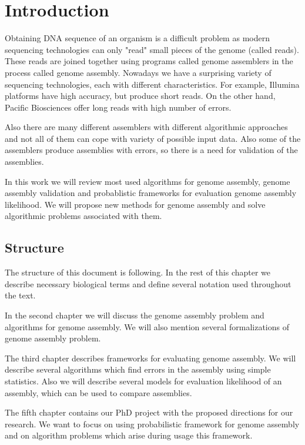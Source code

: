 \chapter{Introduction}

Obtaining DNA sequence of an organism is a difficult problem
as modern sequencing technologies can only "read" small pieces
of the genome (called reads). 
These reads are joined together using programs called genome assemblers
in the process called genome assembly.
Nowadays we have a surprising variety of sequencing technologies,
each with different characteristics. For example,
Illumina platforms have high accuracy, but produce short reads. 
On the other hand, Pacific Biosciences offer long reads with high number
of errors. 

Also there are many different assemblers with different algorithmic
approaches and not all of them can cope with variety of possible input data.
Also some of the assemblers produce assemblies with errors, so
there is a need for validation of the assemblies.

In this work we will review most used algorithms for genome assembly,
genome assembly validation and probablistic frameworks for evaluation
genome assembly likelihood. We will propose new methods
for genome assembly and solve algorithmic problems associated with them.

\section{Structure}

The structure of this document is following. In the rest of this chapter we
describe necessary biological terms and define several notation used throughout
the text.

In the second chapter we will discuss the genome assembly
problem and algorithms for genome assembly.
We will also mention several formalizations of genome assembly problem.

The third chapter describes frameworks for evaluating genome assembly.
We will describe several algorithms which find errors in the assembly
using simple statistics. Also we will describe several models
for evaluation likelihood of an assembly, which can be used
to compare assemblies.

The fifth chapter contains our PhD project with the proposed directions for our
research. We want to focus on using probabilistic framework 
for genome assembly and on algorithm problems which arise during usage this framework.


